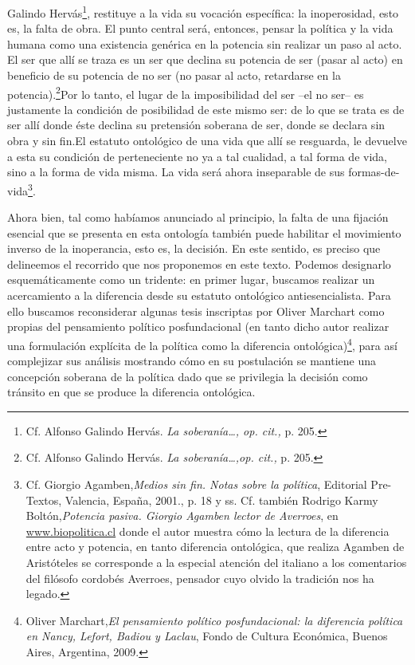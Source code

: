\documentclass{book}
\begin{document}
Galindo Hervás\footnote{Cf. Alfonso Galindo Hervás. \emph{La
  soberanía\ldots, op. cit.,} p. 205.}, restituye a la vida su vocación
específica: la inoperosidad, esto es, la falta de obra. El punto central
será, entonces, pensar la política y la vida humana como una existencia
genérica en la potencia sin realizar un paso al acto. El ser que allí se
traza es un ser que declina su potencia de ser (pasar al acto) en
beneficio de su potencia de no ser (no pasar al acto, retardarse en la
potencia).\footnote{Cf. Alfonso Galindo Hervás. \emph{La
  soberanía\ldots,op. cit.,} p. 205.}Por lo tanto, el lugar de la
imposibilidad del ser --el no ser-- es justamente la condición de
posibilidad de este mismo ser: de lo que se trata es de ser allí donde
éste declina su pretensión soberana de ser, donde se declara sin obra y
sin fin.El estatuto ontológico de una vida que allí se resguarda, le
devuelve a esta su condición de perteneciente no ya a tal cualidad, a
tal forma de vida, sino a la forma de vida misma. La vida será ahora
inseparable de sus formas-de-vida\footnote{Cf. Giorgio
  Agamben,\emph{Medios sin fin. Notas sobre la política}, Editorial
  Pre-Textos, Valencia, España, 2001., p. 18 y ss. Cf. también Rodrigo
  Karmy Boltón,\emph{Potencia pasiva. Giorgio Agamben lector de
  Averroes}, en \href{http://www.biopolitica.cl/}{www.biopolitica.cl}
  donde el autor muestra cómo la lectura de la diferencia entre acto y
  potencia, en tanto diferencia ontológica, que realiza Agamben de
  Aristóteles se corresponde a la especial atención del italiano a los
  comentarios del filósofo cordobés Averroes, pensador cuyo olvido la
  tradición nos ha legado.}.

Ahora bien, tal como habíamos anunciado al principio, la falta de una
fijación esencial que se presenta en esta ontología también puede
habilitar el movimiento inverso de la inoperancia, esto es, la decisión.
En este sentido, es preciso que delineemos el recorrido que nos
proponemos en este texto. Podemos designarlo esquemáticamente como un
tridente: en primer lugar, buscamos realizar un acercamiento a la
diferencia desde su estatuto ontológico antiesencialista. Para ello
buscamos reconsiderar algunas tesis inscriptas por Oliver Marchart como
propias del pensamiento político posfundacional (en tanto dicho autor
realizar una formulación explícita de la política como la diferencia
ontológica)\footnote{Oliver Marchart,\emph{El pensamiento político
  posfundacional: la diferencia política en Nancy, Lefort, Badiou y
  Laclau}, Fondo de Cultura Económica, Buenos Aires, Argentina, 2009.},
para así complejizar sus análisis mostrando cómo en su postulación se
mantiene una concepción soberana de la política dado que se privilegia
la decisión como tránsito en que se produce la diferencia ontológica.
\end{document}
